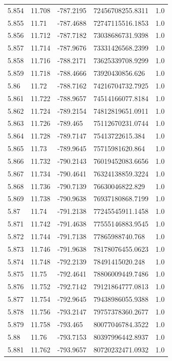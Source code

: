 \begin{tabular}{lllll}
5.854 & 11.708 & -787.2195 & 72456708255.8311 & 1.0 \\
5.855 & 11.71 & -787.4688 & 72747115516.1853 & 1.0 \\
5.856 & 11.712 & -787.7182 & 73038686731.9398 & 1.0 \\
5.857 & 11.714 & -787.9676 & 73331426568.2399 & 1.0 \\
5.858 & 11.716 & -788.2171 & 73625339708.9299 & 1.0 \\
5.859 & 11.718 & -788.4666 & 73920430856.626 & 1.0 \\
5.86 & 11.72 & -788.7162 & 74216704732.7925 & 1.0 \\
5.861 & 11.722 & -788.9657 & 74514166077.8184 & 1.0 \\
5.862 & 11.724 & -789.2154 & 74812819651.0911 & 1.0 \\
5.863 & 11.726 & -789.465 & 75112670231.0744 & 1.0 \\
5.864 & 11.728 & -789.7147 & 75413722615.384 & 1.0 \\
5.865 & 11.73 & -789.9645 & 75715981620.864 & 1.0 \\
5.866 & 11.732 & -790.2143 & 76019452083.6656 & 1.0 \\
5.867 & 11.734 & -790.4641 & 76324138859.3224 & 1.0 \\
5.868 & 11.736 & -790.7139 & 76630046822.829 & 1.0 \\
5.869 & 11.738 & -790.9638 & 76937180868.7199 & 1.0 \\
5.87 & 11.74 & -791.2138 & 77245545911.1458 & 1.0 \\
5.871 & 11.742 & -791.4638 & 77555146883.9545 & 1.0 \\
5.872 & 11.744 & -791.7138 & 77865988740.768 & 1.0 \\
5.873 & 11.746 & -791.9638 & 78178076455.0623 & 1.0 \\
5.874 & 11.748 & -792.2139 & 78491415020.248 & 1.0 \\
5.875 & 11.75 & -792.4641 & 78806009449.7486 & 1.0 \\
5.876 & 11.752 & -792.7142 & 79121864777.0813 & 1.0 \\
5.877 & 11.754 & -792.9645 & 79438986055.9388 & 1.0 \\
5.878 & 11.756 & -793.2147 & 79757378360.2677 & 1.0 \\
5.879 & 11.758 & -793.465 & 80077046784.3522 & 1.0 \\
5.88 & 11.76 & -793.7153 & 80397996442.8937 & 1.0 \\
5.881 & 11.762 & -793.9657 & 80720232471.0932 & 1.0 \\

\end{tabular}
